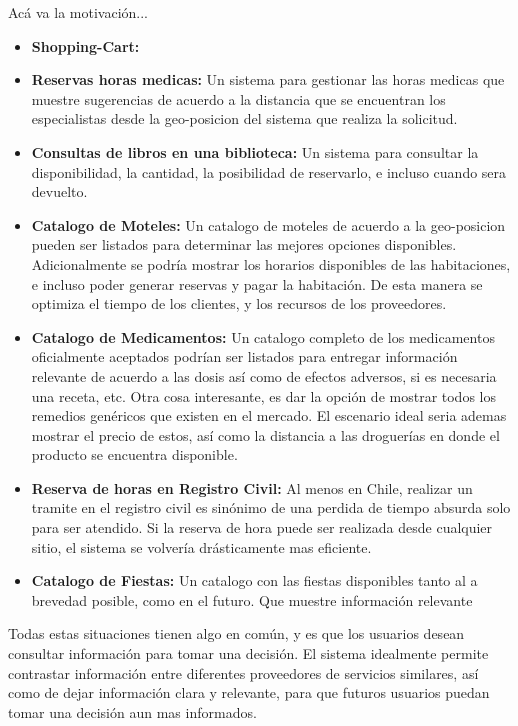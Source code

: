 Acá va la motivación...

\begin{itemize}
	\item \textbf{Shopping-Cart:}
	
	\item \textbf{Reservas horas medicas:} Un sistema para gestionar las horas medicas que muestre sugerencias de acuerdo a la distancia que se encuentran los especialistas desde la geo-posicion del sistema que realiza la solicitud. 
	
	\item \textbf{Consultas de libros en una biblioteca:} Un sistema para consultar la disponibilidad, la cantidad, la posibilidad de reservarlo, e incluso cuando sera devuelto.
	\item \textbf{Catalogo de Moteles:} Un catalogo de moteles de acuerdo a la geo-posicion pueden ser listados para determinar las mejores opciones disponibles. Adicionalmente se podría mostrar los horarios disponibles de las habitaciones, e incluso poder generar reservas y pagar la habitación. De esta manera se optimiza el tiempo de los clientes, y los recursos de los proveedores.
	
	\item \textbf{Catalogo de Medicamentos:} Un catalogo completo de los medicamentos oficialmente aceptados podrían ser listados para entregar información relevante de acuerdo a las dosis así como de efectos adversos, si es necesaria una receta, etc. Otra cosa interesante, es dar la opción de mostrar todos los remedios genéricos que existen en el mercado. El escenario ideal seria ademas mostrar el precio de estos, así como la distancia a las droguerías en donde el producto se encuentra disponible.
	
	\item \textbf{Reserva de horas en Registro Civil:} Al menos en Chile, realizar un tramite en el registro civil es sinónimo de una perdida de tiempo absurda solo para ser atendido. Si la reserva de hora puede ser realizada desde cualquier sitio, el sistema se volvería drásticamente mas eficiente.
	
	\item \textbf{Catalogo de Fiestas:} Un catalogo con las fiestas disponibles tanto al a brevedad posible, como en el futuro. Que muestre información relevante 
	
\end{itemize}

Todas estas situaciones tienen algo en común, y es que los usuarios desean consultar información para tomar una decisión. El sistema idealmente permite contrastar información entre diferentes proveedores de servicios similares, así como de dejar información clara y relevante, para que futuros usuarios puedan tomar una decisión aun mas informados.

